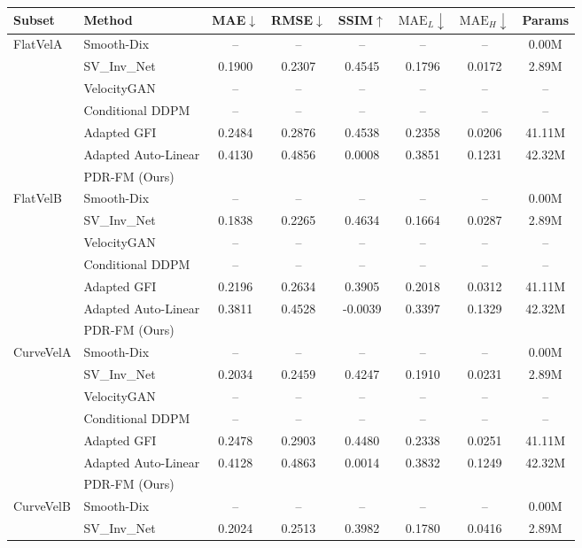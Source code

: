 \documentclass[letterpaper]{article}
\begin{document}
\begin{table}[t]
\centering
{\scriptsize
\setlength{\tabcolsep}{2pt}
\begin{tabular}{llcccccc}
\hline
Subset & Method & MAE$\downarrow$ & RMSE$\downarrow$ & SSIM$\uparrow$ & $\mathrm{MAE}_L\downarrow$ & $\mathrm{MAE}_H\downarrow$ & Params \\
\hline
FlatVelA & Smooth-Dix & -- & -- & -- & -- & -- & 0.00M \\
 & SV\_Inv\_Net & 0.1900 & 0.2307 & 0.4545 & 0.1796 & 0.0172 & 2.89M \\
 & VelocityGAN & -- & -- & -- & -- & -- & -- \\
 & Conditional DDPM & -- & -- & -- & -- & -- & -- \\
 & Adapted GFI & 0.2484 & 0.2876 & 0.4538 & 0.2358 & 0.0206 & 41.11M \\
 & Adapted Auto-Linear & 0.4130 & 0.4856 & 0.0008 & 0.3851 & 0.1231 & 42.32M \\
 & PDR-FM (Ours) &  &  &  &  &  &  \\
\hline
FlatVelB & Smooth-Dix & -- & -- & -- & -- & -- & 0.00M \\
 & SV\_Inv\_Net & 0.1838 & 0.2265 & 0.4634 & 0.1664 & 0.0287 & 2.89M \\
 & VelocityGAN & -- & -- & -- & -- & -- & -- \\
 & Conditional DDPM & -- & -- & -- & -- & -- & -- \\
 & Adapted GFI & 0.2196 & 0.2634 & 0.3905 & 0.2018 & 0.0312 & 41.11M \\
 & Adapted Auto-Linear & 0.3811 & 0.4528 & -0.0039 & 0.3397 & 0.1329 & 42.32M \\
 & PDR-FM (Ours) &  &  &  &  &  &  \\
\hline
CurveVelA & Smooth-Dix & -- & -- & -- & -- & -- & 0.00M \\
 & SV\_Inv\_Net & 0.2034 & 0.2459 & 0.4247 & 0.1910 & 0.0231 & 2.89M \\
 & VelocityGAN & -- & -- & -- & -- & -- & -- \\
 & Conditional DDPM & -- & -- & -- & -- & -- & -- \\
 & Adapted GFI & 0.2478 & 0.2903 & 0.4480 & 0.2338 & 0.0251 & 41.11M \\
 & Adapted Auto-Linear & 0.4128 & 0.4863 & 0.0014 & 0.3832 & 0.1249 & 42.32M \\
 & PDR-FM (Ours) &  &  &  &  &  &  \\
\hline
CurveVelB & Smooth-Dix & -- & -- & -- & -- & -- & 0.00M \\
 & SV\_Inv\_Net & 0.2024 & 0.2513 & 0.3982 & 0.1780 & 0.0416 & 2.89M \\

\end{tabular}}
\end{table}
\end{document}
